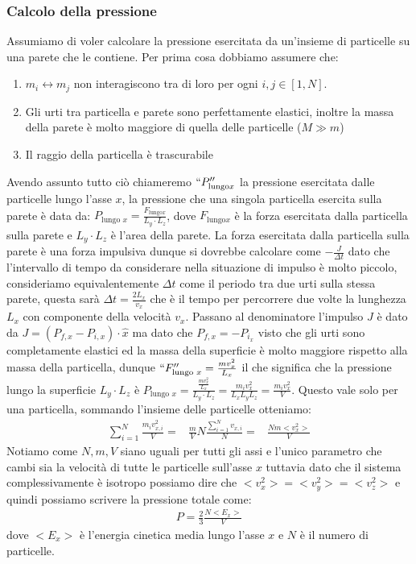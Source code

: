 \subsubsection{Calcolo della pressione}
    Assumiamo di voler calcolare la pressione esercitata da un'insieme di particelle su una parete che le contiene. Per prima cosa dobbiamo assumere che: \begin{enumerate}
        \item $m_i \leftrightarrow m_j$ non interagiscono tra di loro per ogni $i,j \in [1,N]$.
        \item Gli urti tra particella e parete sono perfettamente elastici, inoltre la massa della parete è molto maggiore di quella delle particelle ($M\gg m$)
        \item Il raggio della particella è trascurabile
    \end{enumerate}
    Avendo assunto tutto ciò chiameremo $``P_{\text{lungo} x}''$ la pressione esercitata dalle particelle lungo l'asse $x$, la pressione che una singola particella esercita sulla parete è data da: $P_{\text{lungo } x}=\frac{F_{\text{lungo} x}}{L_y\cdot L_z}$, dove $F_{\text{lungo} x}$ è la forza esercitata dalla particella sulla parete e $L_y\cdot L_z$ è l'area della parete. La forza esercitata dalla particella sulla parete è una forza impulsiva dunque si dovrebbe calcolare come $-\frac{J}{\Delta t}$ dato che l'intervallo di tempo da considerare nella situazione di impulso è molto piccolo, consideriamo equivalentemente $\Delta t$ come il periodo tra due urti sulla stessa parete, questa sarà $\Delta t=\frac{2L_x}{v_x}$ che è il tempo per percorrere due volte la lunghezza $L_x$ con componente della velocità $v_x$. Passano al denominatore l'impulso $J$ è dato da $J=(P_{f,x}-P_{i,x})\cdot \hat{x}$ ma dato che $P_{f,x}=-P_{i_x}$ visto che gli urti sono completamente elastici ed la massa della superficie è molto maggiore rispetto alla massa della particella, dunque $``F_{\text{lungo } x}''=\frac{m v_x^2}{L_x}$ il che significa che la pressione lungo la superficie $L_y\cdot L_z$ è $P_{\text{lungo }x} = \frac{\frac{m v_x^2}{L_x}}{L_y\cdot L_z} = \frac{m_iv_x^2}{L_xL_yL_z}=\frac{m_iv_x^2}{V}$. Questo vale solo per una particella, sommando l'insieme delle particelle otteniamo:
    \begin{align*}
        \sum_{i=1}^N\frac{m_iv_{x,i}^2}{V}=&\frac{m}{V}N\frac{\sum_{i=1}^N v_{x,i}}{N}
        =&\frac{Nm<v_x^2>}{V}
    \end{align*}
    Notiamo come $N,m,V$ siano uguali per tutti gli assi e l'unico parametro che cambi sia la velocità di tutte le particelle sull'asse $x$ tuttavia dato che il sistema complessivamente è isotropo possiamo dire che $<v_x^2>=<v_y^2>=<v_z^2>$ e quindi possiamo scrivere la pressione totale come:
    \begin{align}
        P = \frac23\frac{N<E_x>}{V}
    \end{align}
    dove $<E_x>$ è l'energia cinetica media lungo l'asse $x$ e $N$ è il numero di particelle. 
